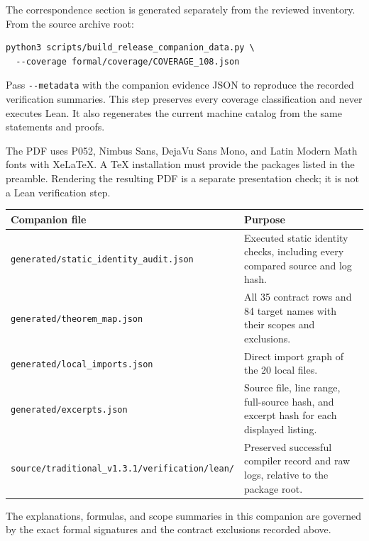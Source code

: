 \documentclass[11pt,a4paper]{article}
\newcommand{\code}[1]{\nolinkurl{#1}}
\begin{document}
The correspondence section is generated separately from the reviewed inventory. From the source archive root:
\begin{lstlisting}
python3 scripts/build_release_companion_data.py \
  --coverage formal/coverage/COVERAGE_108.json
\end{lstlisting}
Pass \code{--metadata} with the companion evidence JSON to reproduce the recorded verification summaries. This step preserves every coverage classification and never executes Lean. It also regenerates the current machine catalog from the same statements and proofs.

The PDF uses P052, Nimbus Sans, DejaVu Sans Mono, and Latin Modern Math fonts with XeLaTeX. A TeX installation must provide the packages listed in the preamble. Rendering the resulting PDF is a separate presentation check; it is not a Lean verification step.

\begin{longtable}{p{}p{}}
\toprule Companion file & Purpose \\\midrule\endhead
\code{generated/static_identity_audit.json} & Executed static identity checks, including every compared source and log hash. \\
\code{generated/theorem_map.json} & All 35 contract rows and 84 target names with their scopes and exclusions. \\
\code{generated/local_imports.json} & Direct import graph of the 20 local files. \\
\code{generated/excerpts.json} & Source file, line range, full-source hash, and excerpt hash for each displayed listing. \\
\code{source/traditional_v1.3.1/verification/lean/} & Preserved successful compiler record and raw logs, relative to the package root. \\
\bottomrule
\end{longtable}

The explanations, formulas, and scope summaries in this companion are governed by the exact formal signatures and the contract exclusions recorded above.
\end{document}
